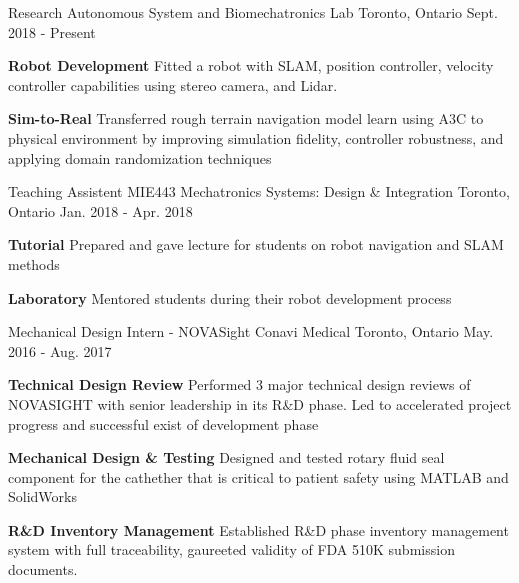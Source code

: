 \begin{cventries}
  \cventry
    {Research}
    {Autonomous System and Biomechatronics Lab}
    {Toronto, Ontario}
    {Sept. 2018 - Present}
    {
      \begin{cvitems}
        \item {
          \textbf{Robot Development} Fitted a robot with SLAM, position controller, velocity controller capabilities using stereo camera, and Lidar. 
        }
        \item {
          \textbf{Sim-to-Real} Transferred rough terrain navigation model learn using A3C to physical environment by improving simulation fidelity, controller robustness, and applying domain randomization techniques
        }
      \end{cvitems}
    }
  \cventry
    {Teaching Assistent}
    {MIE443 Mechatronics Systems: Design \& Integration}
    {Toronto, Ontario}
    {Jan. 2018 - Apr. 2018}
    {
      \begin{cvitems}
        \item {
          \textbf{Tutorial} Prepared and gave lecture for students on robot navigation and SLAM methods
        }
        \item {
          \textbf{Laboratory} Mentored students during their robot development process
        }
      \end{cvitems}
    }
  \cventry
    {Mechanical Design Intern - NOVASight}
    {Conavi Medical}
    {Toronto, Ontario}
    {May. 2016 - Aug. 2017}
    {
      \begin{cvitems}
        \item {
          \textbf{Technical Design Review} Performed 3 major technical design reviews of NOVASIGHT with senior leadership in its R\&D phase. Led to accelerated project progress and successful exist of development phase
        }
        \item {
            \textbf{Mechanical Design \& Testing} Designed and tested rotary fluid seal component for the cathether that is critical to patient safety using MATLAB and SolidWorks
        }
        \item {
            \textbf{R\&D Inventory Management} Established R\&D phase inventory management system with full traceability, gaureeted validity of FDA 510K submission documents.
        }
      \end{cvitems}
    }  
\end{cventries}
